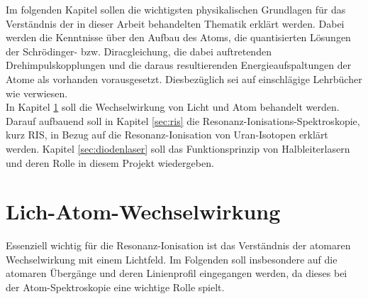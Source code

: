 Im folgenden Kapitel sollen die wichtigsten physikalischen Grundlagen für das
Verständnis der in dieser Arbeit behandelten Thematik erklärt werden. Dabei
werden die Kenntnisse über den Aufbau des Atoms, die quantisierten Lösungen der
Schrödinger- bzw. Diracgleichung, die dabei auftretenden Drehimpulskopplungen
und die daraus resultierenden Energieaufspaltungen der Atome als vorhanden
vorausgesetzt. Diesbezüglich sei auf einschlägige Lehrbücher wie
\cite{demtroeder:ex3} verwiesen.\\
In Kapitel \ref{sec:licht-atom-wechselwirkung} soll die Wechselwirkung von
Licht und Atom behandelt werden. Darauf aufbauend soll
in Kapitel \ref{sec:ris} die Resonanz-Ionisations-Spektroskopie,
kurz RIS, in Bezug auf die Resonanz-Ionisation von Uran-Isotopen erklärt
werden. Kapitel \ref{sec:diodenlaser} soll das Funktionsprinzip von
Halbleiterlasern und deren Rolle in diesem Projekt wiedergeben.

\section{Lich-Atom-Wechselwirkung}\label{sec:licht-atom-wechselwirkung}

Essenziell wichtig für die Resonanz-Ionisation ist das Verständnis der atomaren
Wechselwirkung mit einem Lichtfeld. Im Folgenden soll insbesondere auf die
atomaren Übergänge und deren Linienprofil eingegangen werden, da dieses bei der
Atom-Spektroskopie eine wichtige Rolle spielt.




